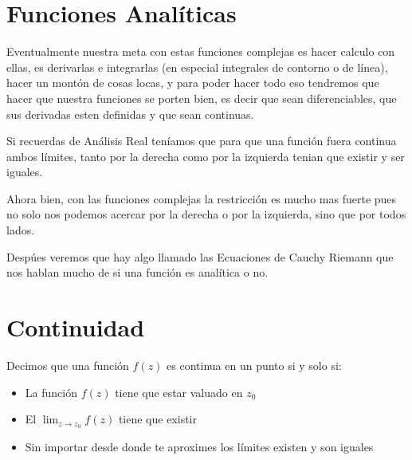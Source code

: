 \documentclass[12pt, fleqn]{report}                             %
\begin{document}
   



        \section{Funciones Analíticas}

            Eventualmente nuestra meta con estas funciones complejas es hacer 
            calculo con ellas, es derivarlas e integrarlas (en especial integrales
            de contorno o de línea), hacer un montón de cosas locas, y para poder
            hacer todo eso tendremos que hacer que nuestra funciones se porten bien,
            es decir que sean diferenciables, que sus derivadas esten definidas y
            que sean continuas.

            Si recuerdas de Análisis Real teníamos que para que una función fuera 
            continua ambos límites, tanto por la derecha como por la izquierda 
            tenian que existir y ser iguales.

            Ahora bien, con las funciones complejas la restricción es mucho mas fuerte
            pues no solo nos podemos acercar por la derecha o por la izquierda, sino que 
            por todos lados.

            Despúes veremos que hay algo llamado las Ecuaciones de Cauchy Riemann que
            nos hablan mucho de si una función es analítica o no.


        \section{Continuidad}

            Decimos que una función $f(z)$ es continua en un punto si y solo si:
            \begin{itemize}
                \item La función $f(z)$ tiene que estar valuado en $z_0$
                \item El $\lim_{z \to z_0} f(z)$ tiene que existir
                \item Sin importar desde donde te aproximes los límites existen y son iguales
            \end{itemize}
\end{document}
